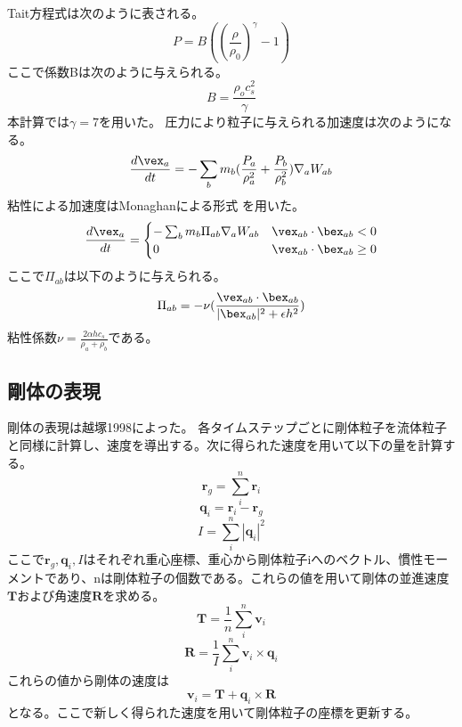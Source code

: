 \documentclass[]{jsarticle}
\begin{document}
Tait方程式は次のように表される。
\begin{equation}
P=B((\frac{\rho}{\rho_0})^\gamma-1)
\end{equation}
ここで係数Bは次のように与えられる。
\begin{equation}
B=\frac{\rho_oc_s^2}{\gamma}
\end{equation}
本計算では$\gamma=7$を用いた。
圧力により粒子に与えられる加速度は次のようになる。
\begin{equation}
\frac{d\vex_a}{dt}=-\sum_bm_b(\frac{P_a}{\rho_a^2}+\frac{P_b}{\rho_b^2})\nabla_aW_{ab}
\end{equation}
粘性による加速度はMonaghanによる形式 \cite{Monaghan2005}を用いた。
\begin{equation}
\frac{d\vex_a}{dt}=\begin{cases}
  -\sum_bm_b\Pi_{ab}\nabla_aW_{ab} & \vex_{ab}\cdot\bex_{ab}<0 \\
  0 & \vex_{ab}\cdot\bex_{ab}\geq0
\end{cases}
\end{equation}
ここで$\Pi_{ab}$は以下のように与えられる。
\begin{equation}
\Pi_{ab}=-\nu(\frac{\vex_{ab}\cdot\bex_{ab}}{|\bex_{ab}|^2+\epsilon h^2})
\end{equation}
粘性係数$\nu=\frac{2\alpha h c_s}{\rho_a+\rho_b}$である。

\subsection{剛体の表現}
剛体の表現は越塚1998\cite{Koshizuka1998}によった。
各タイムステップごとに剛体粒子を流体粒子と同様に計算し、速度を導出する。次に得られた速度を用いて以下の量を計算する。
\begin{equation}
  \bm{r}_g=\sum_{i}^n{\bm{r}_i}
\end{equation}
\begin{equation}
  \bm{q}_i=\bm{r}_i-\bm{r}_g
\end{equation}
\begin{equation}
  I=\sum_{i}^n{|\bm{q}_i|^2}
\end{equation}
ここで$\bm{r}_g,\bm{q}_i,I$はそれぞれ重心座標、重心から剛体粒子iへのベクトル、慣性モーメントであり、nは剛体粒子の個数である。これらの値を用いて剛体の並進速度$\bm{T}$および角速度$\bm{R}$を求める。
\begin{equation}
  \bm{T}=\frac{1}{n}\sum_{i}^n{\bm{v}_i}
\end{equation}
\begin{equation}
  \bm{R}=\frac{1}{I}\sum_{i}^n{\bm{v}_i\times\bm{q}_i}
\end{equation}
これらの値から剛体の速度は
\begin{equation}
\bm{v}_i=\bm{T}+\bm{q}_i\times\bm{R}
\end{equation}
となる。ここで新しく得られた速度を用いて剛体粒子の座標を更新する。
\end{document}
